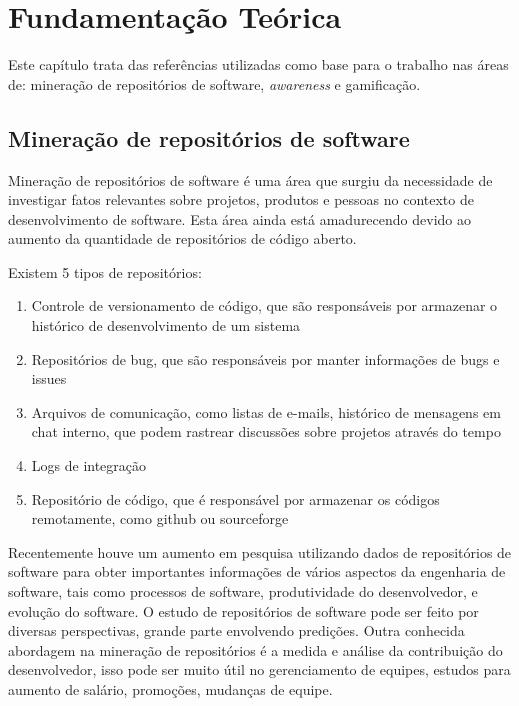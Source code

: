 \chapter[Fundamentação Teórica]{Fundamentação Teórica}
Este capítulo trata das referências utilizadas como base para o trabalho nas áreas de: mineração de repositórios de software, \textit{awareness} e gamificação.

\section{Mineração de repositórios de software} 
Mineração de repositórios de software é uma área que surgiu da necessidade de investigar fatos relevantes sobre projetos, produtos e pessoas no contexto de desenvolvimento de software. Esta área ainda está amadurecendo devido ao aumento da quantidade de repositórios de código aberto. 

Existem 5 tipos de repositórios:
\begin{enumerate}
\item Controle de versionamento de código, que são responsáveis por armazenar o histórico de desenvolvimento de um sistema
\item Repositórios de bug, que são responsáveis por manter informações de bugs e issues 
\item Arquivos de comunicação, como listas de e-mails, histórico de mensagens em chat interno, que podem rastrear discussões sobre projetos através do tempo
\item Logs de integração 
\item Repositório de código, que é responsável por armazenar os códigos remotamente, como github ou sourceforge
\end{enumerate}
Recentemente houve um aumento em pesquisa utilizando dados de repositórios de software para obter importantes informações de vários aspectos da engenharia de software, tais como processos de software, produtividade do desenvolvedor, e evolução do software. O estudo de repositórios de software pode ser feito por diversas perspectivas, grande parte envolvendo predições. Outra conhecida abordagem na mineração de repositórios é a medida e análise da contribuição do desenvolvedor, isso pode ser muito útil no gerenciamento de equipes, estudos para aumento de salário, promoções, mudanças de equipe.
